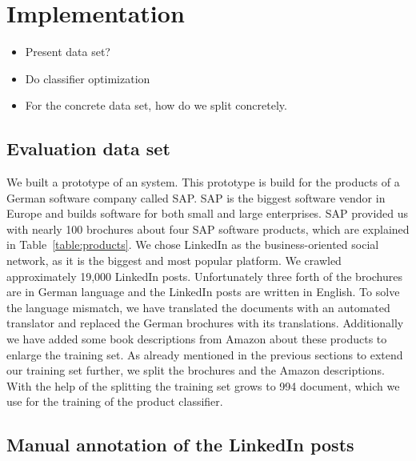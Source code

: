 
\section{Implementation}
\label{sec:implementation}

\begin{itemize}
	\item Present data set?
	\item Do classifier optimization
	\item For the concrete data set, how do we split concretely.
\end{itemize}

\subsection{Evaluation data set}
\label{sub:initial_data_set}
We built a prototype of an \nto system.
This prototype is build for the products of a German software company called SAP.
SAP is the biggest software vendor in Europe and builds software for both small and large enterprises.
SAP provided us with nearly 100 brochures about four SAP software products, which are explained in Table~\ref{table:products}.
We chose LinkedIn as the business-oriented social network, as it is the biggest and most popular platform.
We crawled approximately 19,000 LinkedIn posts.
Unfortunately three forth of the brochures are in German language and the LinkedIn posts are written in English.
To solve the language mismatch, we have translated the documents with an automated translator and replaced the German brochures with its translations.
Additionally we have added some book descriptions from Amazon about these products to enlarge the training set.
As already mentioned in the previous sections to extend our training set further, we split the brochures and the Amazon descriptions.
With the help of the splitting the training set grows to 994 document, which we use for the training of the product classifier.

\subsection{Manual annotation of the LinkedIn posts}
\label{sub:manual_annotation_of_the_linkedin_posts}

